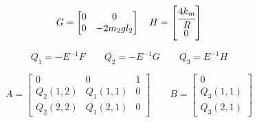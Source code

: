 \documentclass[12pt,a4paper,openany]{extarticle}
\begin{document}
\begin{equation}
G = 
\begin{bmatrix}
0 & 0\\
0 & -2m_2gl_2
\end{bmatrix}
\quad
H = 
\begin{bmatrix}
\cfrac{4k_m}{R}\\
0
\end{bmatrix}
\end{equation}

\begin{equation}
Q_1 = -E^{-1}F \qquad Q_2 = -E^{-1}G \qquad Q_3 = E^{-1}H
\end{equation}


\begin{equation}
A = 
\begin{bmatrix}
0 & 0 & 1\\
Q_2(1,2) & Q_1(1,1) & 0\\
Q_2(2,2) & Q_1(2,1) & 0
\end{bmatrix}
\qquad
B= 
\begin{bmatrix}
0 \\ Q_3(1,1) \\ Q_3(2,1)
\end{bmatrix}
\end{equation}
\end{document}
